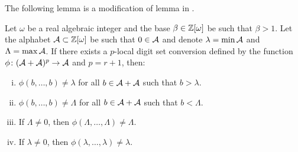 The following lemma is a modification of lemma in \cite{minAlph}.
\begin{lem}
\label{lem:alphabetRestrictions}
Let $\omega$ be a real algebraic integer and the base $\beta\in\mathbb{Z}[\omega]$ be such that $\beta>1$. Let the alphabet $\mathcal{A}\subset\mathbb{Z}[\omega]$ be such that $0\in\mathcal{A}$ and denote $\lambda=\min \mathcal{A}$ and $\Lambda=\max \mathcal{A}$. If there exists a $p$-local digit set conversion defined by the function $\phi\colon (\mathcal{A}+\mathcal{A})^p\rightarrow \mathcal{A}$ and $p=r+1$, then:
\begin{enumerate}[i)]
	\item $\phi(b,\dots,b)\neq \lambda$ for all $b\in\mathcal{A}+\mathcal{A}$ such that $b>\lambda$.
	\item $\phi(b,\dots,b)\neq \Lambda$ for all $b\in\mathcal{A}+\mathcal{A}$ such that $b<\Lambda$.
	\item If $\Lambda\neq 0$, then $\phi(\Lambda,\dots,\Lambda)\neq \Lambda$.
	\item If $\lambda\neq 0$, then $\phi(\lambda,\dots,\lambda)\neq \lambda$.
\end{enumerate}
\end{lem}
